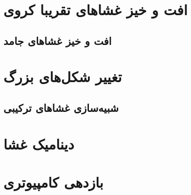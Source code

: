 \section{\label{sec:resultsBendingFluctuations}
افت و خیز غشا‌های تقریبا کروی
}


\subsection{
افت و خیز غشا‌های جامد
}


\section{\label{sec:larger shape changes}
تغییر شکل‌های بزرگ
}


\subsection{
شبیه‌سازی غشاهای ترکیبی
}


\section{\label{sec:dynamics}
دینامیک غشا
}


\section{\label{sec:computational efficiency}
بازدهی کامپیوتری
}




